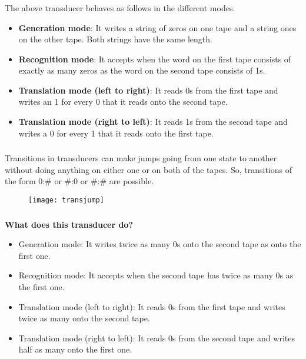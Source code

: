 \begin{frame}

	\frametitle{\insertsection}
	\framesubtitle{\insertsubsection}
	
	The above transducer behaves as follows in the different modes.
	
	\begin{itemize}
		\item \textbf{Generation mode}: It writes a string of zeros on one tape and a string ones on the other tape. Both strings have the same length.
		\item \textbf{Recognition mode}: It accepts when the word on the first tape consists of exactly as many zeros as the word on the second tape consists of 1s.
		\item \textbf{Translation mode (left to right)}: It reads 0s from the first tape and writes an 1 for every 0 that it reads onto the second tape.
		\item \textbf{Translation mode (right to left)}: It reads 1s from the second tape and writes a 0 for every 1 that it reads onto the first tape.
	\end{itemize}

\end{frame}

\begin{frame}

	\frametitle{\insertsection}
	\framesubtitle{\insertsubsection}
	
	Transitions in transducers can make jumps going from one state to another without doing anything on either one or on both of the tapes. 
	So, transitions of the form 0:\# or \#:0 or \#:\# are possible.
	
	\begin{figure}
		\texttt{[image: transjump]}
	\end{figure}

\end{frame}


\begin{frame}

	\frametitle{\insertsection}
	\framesubtitle{\insertsubsection}
	
	\textbf{What does this transducer do?}
	
	\begin{itemize}
		\item Generation mode: It writes twice as many 0s onto the second tape as onto the first one.
		\item Recognition mode: It accepts when the second tape has twice as many 0s as the first one.
		\item Translation mode (left to right): It reads 0s from the first tape and writes twice as many onto the second tape.
		\item Translation mode (right to left): It reads 0s from the second tape and writes half as many onto the first one.
	\end{itemize}
	
\end{frame}